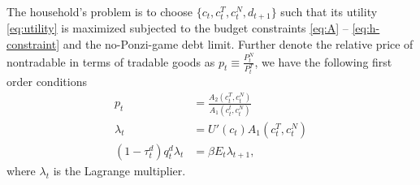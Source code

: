 The household's problem is to choose $\{c_t, c_t^T, c_t^N, d_{t+1}\}$ such that its utility \eqref{eq:utility} is maximized subjected to the budget constraints \eqref{eq:A} -- \eqref{eq:h-constraint} and the no-Ponzi-game debt limit.
Further denote the relative price of nontradable in terms of tradable goods as $p_t \equiv \frac{P^N_t}{P^T_t}$, we have the following first order conditions
\begin{subequations}
    \begin{align}
        p_t &= \frac{A_2(c_t^T, c_t^N)}{A_1(c_t^t, c_t^N)} \label{eq:FOC-HH-1} \\
        \lambda_t &= U'(c_t)A_1(c_t^T, c_t^N)\\
        (1-\tau_t^d)q_t^d \lambda_t &= \beta E_t \lambda_{t+1},
    \end{align}
\end{subequations}
where $\lambda_t$ is the Lagrange multiplier.